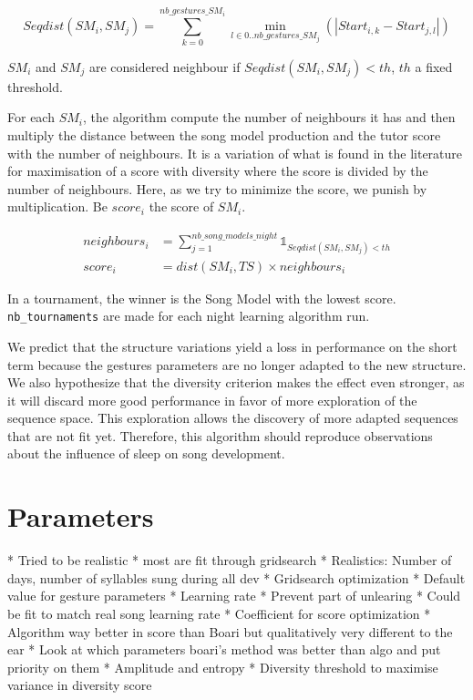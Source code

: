 \documentclass{report}
\begin{document}
\begin{equation}
  Seqdist(SM_i, SM_j) = \sum_{k=0}^{nb\_gestures\_SM_i}
      \min_{l \in 0..nb\_gestures\_SM_j}(|Start_{i,k} - Start_{j, l}|)
\end{equation}

\(SM_i\) and \(SM_j\) are considered neighbour if $Seqdist(SM_i, SM_j) < th$,
$th$ a fixed threshold.

For each $SM_i$, the algorithm compute the number of neighbours it has and then
multiply the distance between the song model production and the tutor score with
the number of neighbours. It is a variation of what is found in the literature
for maximisation of a score with diversity where the score is divided by the
number of neighbours. Here, as we try to minimize the score, we punish by
multiplication. Be $score_i$ the score of $SM_i$.

\begin{align}
  neighbours_i &= \sum_{j=1}^{nb\_song\_models\_night}
  \mathds{1}_{Seqdist(SM_i, SM_j) < th} \\
  score_i &= dist(SM_i, TS) \times neighbours_i
\end{align}

In a tournament, the winner is the Song Model with the lowest score.
\texttt{nb\_tournaments} are made for each night learning algorithm run.


We predict that the structure variations yield a loss in performance on the
short term because the gestures parameters are no longer adapted to the new
structure. We also hypothesize that the diversity criterion makes the effect
even stronger, as it will discard more good performance in favor of more
exploration of the sequence space. This exploration allows the discovery of more
adapted sequences that are not fit yet. Therefore, this algorithm should
reproduce \textcite{deregnaucourt_how_2005} observations about the influence of
sleep on song development.

\section{Parameters} \label{parameters}

  * Tried to be realistic
  * most are fit through gridsearch
  * Realistics: Number of days, number of syllables sung during all dev
  * Gridsearch optimization
  * Default value for gesture parameters
  * Learning rate
        * Prevent part of unlearing
      * Could be fit to match real song learning rate
      * Coefficient for score optimization
    * Algorithm way better in score than Boari but qualitatively very
  different to the ear
  * Look at which parameters boari's method was better than algo and put
  priority on them
  * Amplitude and entropy
  * Diversity threshold to maximise variance in diversity score
\end{document}
